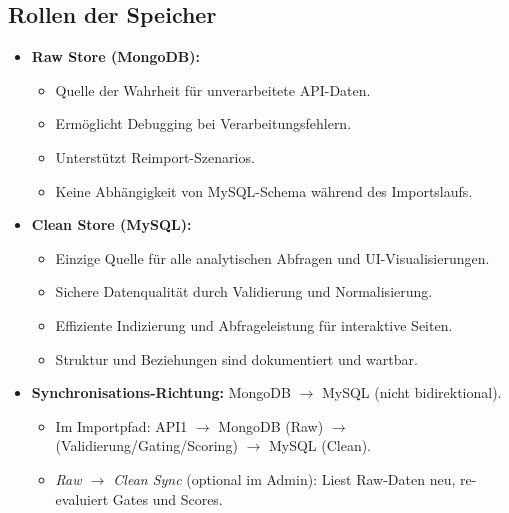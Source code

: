 \subsection{Rollen der Speicher}
\begin{itemize}
  \item \textbf{Raw Store (MongoDB):}
    \begin{itemize}
      \item Quelle der Wahrheit für unverarbeitete API-Daten.
      \item Ermöglicht Debugging bei Verarbeitungsfehlern.
      \item Unterstützt Reimport-Szenarios.
      \item Keine Abhängigkeit von MySQL-Schema während des Importslaufs.
    \end{itemize}
  \item \textbf{Clean Store (MySQL):}
    \begin{itemize}
      \item Einzige Quelle für alle analytischen Abfragen und UI-Visualisierungen.
      \item Sichere Datenqualität durch Validierung und Normalisierung.
      \item Effiziente Indizierung und Abfrageleistung für interaktive Seiten.
      \item Struktur und Beziehungen sind dokumentiert und wartbar.
    \end{itemize}
  \item \textbf{Synchronisations-Richtung:} MongoDB $\rightarrow$ MySQL (nicht bidirektional). %
    \begin{itemize}
      \item Im Importpfad: API1 $\rightarrow$ MongoDB (Raw) $\rightarrow$ (Validierung/Gating/Scoring) $\rightarrow$ MySQL (Clean). %
      \item \textit{Raw $\rightarrow$ Clean Sync} (optional im Admin): Liest Raw-Daten neu, re-evaluiert Gates und Scores.
    \end{itemize}
\end{itemize}

